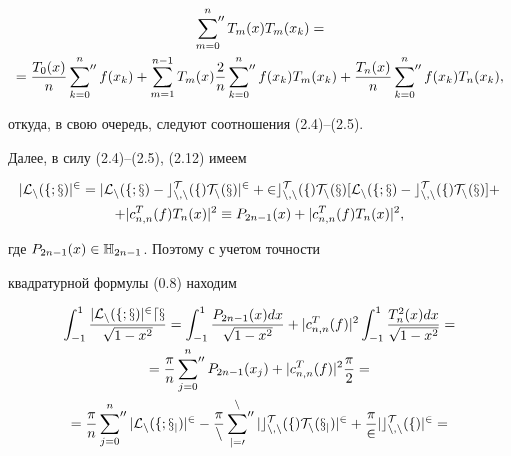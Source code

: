 \begin{pf}
\begin{multline}
\sideset{}{''}\sum_{m=0}^n T_m(x)T_m(x_k)=\\


%


=\frac{T_0(x)}{n}\sideset{}{''}\sum_{k=0}^n f(x_k)+\sum_{m=1}^{n-1}T_m(x)


\frac{2}{n}\sideset{}{''}\sum_{k=0}^n f(x_k)T_m(x_k)+\frac{T_n(x)}{n}


\sideset{}{''}\sum_{k=0}^n f(x_k)T_n(x_k),


\end{multline}


откуда, в свою очередь, следуют соотношения (2.4)--(2.5).





Далее, в силу (2.4)--(2.5), (2.12) имеем


\begin{multline*}


|\cal{L}_n(f;x)|^2=|\cal{L}_n(f;x) - c_{n,n}^T(f)T_n(x)|^2+


2c_{n,n}^T(f)T_n(x)[\cal{L}_n(f;x)-c_{n,n}^T(f)T_n(x)]+ \\


+|c_{n,n}^T(f)T_n(x)|^2 \equiv P_{2n-1}(x)+|c_{n,n}^T(f)T_n(x)|^2,


\end{multline*}


где $P_{2n-1}(x)\in \Bbb{H}_{2n-1}$. Поэтому с учетом точности \cite{9} 


квадратурной формулы (0.8) находим


\begin{multline*}


\int_{-1}^1 \frac{|\cal{L}_n(f;x)|^2dx}{\sqrt{1-x^2}}=\int_{-1}^1\frac


{P_{2n-1}(x)dx}{\sqrt{1-x^2}}+|c_{n,n}^T(f)|^2\int_{-1}^1


\frac{T_n^2(x)dx}{\sqrt{1-x^2}}=\\


%


=\frac{\pi}{n}\sideset{}{''}\sum_{j=0}^n P_{2n-1}(x_j)+|c_{n,n}^T(f)|^2\frac{\pi}{2}=\\


%


=\frac{\pi}{n}\sideset{}{''}\sum_{j=0}^n |\cal{L}_n(f;x_j)|^2 -


\frac{\pi}{n}\sideset{}{''}\sum_{j=0}^n


|c_{n,n}^T(f)T_n(x_j)|^2+\frac{\pi}{2}|c_{n,n}^T(f)|^2=\\



\end{multline*}
\end{pf}
